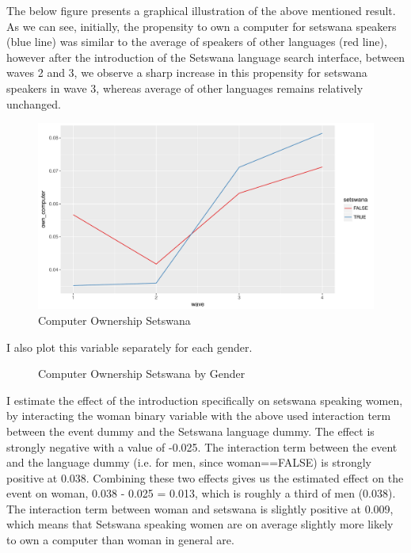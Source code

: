\documentclass[a4paper,british]{article}\usepackage[]{graphicx}\usepackage[]{color}
\makeatletter
\def\maxwidth{ %
  \ifdim\Gin@nat@width>\linewidth
    \linewidth
  \else
    \Gin@nat@width
  \fi
}
\newenvironment{kframe}{%
 \def\at@end@of@kframe{}%
 \ifinner\ifhmode%
  \def\at@end@of@kframe{\end{minipage}}%
  \begin{minipage}{\columnwidth}%
 \fi\fi%
 \def\FrameCommand##1{\hskip\@totalleftmargin \hskip-\fboxsep
 \colorbox{shadecolor}{##1}\hskip-\fboxsep
     \hskip-\linewidth \hskip-\@totalleftmargin \hskip\columnwidth}%
 \MakeFramed {\advance\hsize-\width
   \@totalleftmargin\z@ \linewidth\hsize
   \@setminipage}}%
 {\par\unskip\endMakeFramed%
 \at@end@of@kframe}
\newenvironment{knitrout}{}{} %
\makeatother
\begin{document}
The below figure presents a graphical illustration of the above mentioned
result. As we can see, initially, the propensity to own a computer
for setswana speakers (blue line) was similar to the average of speakers
of other languages (red line), however after the introduction of the
Setswana language search interface, between waves 2 and 3, we observe
a sharp increase in this propensity for setswana speakers in wave
3, whereas average of other languages remains relatively unchanged.

\begin{figure}[H]
\caption{Computer Ownership Setswana}

\begin{knitrout}
\color{fgcolor}
\includegraphics[width=\maxwidth]{../misc/latex-gg2_5-1} 

\end{knitrout}
\end{figure}

I also plot this variable separately for each gender.

\begin{figure}[H]
\caption{Computer Ownership Setswana by Gender}

\begin{knitrout}
\color{fgcolor}\begin{kframe}


{\ttfamily\noindent\bfseries\color{errorcolor}{\#\# Error in grouped\_df\_impl(data, unname(vars), drop): Column `woman` is unknown}}\end{kframe}
\end{knitrout}
\end{figure}

I estimate the effect of the introduction specifically on setswana
speaking women, by interacting the woman binary variable with the
above used interaction term between the event dummy and the Setswana
language dummy. The effect is strongly negative with a value of -0.025.
The interaction term between the event and the language dummy (i.e.
for men, since woman==FALSE) is strongly positive at 0.038. Combining
these two effects gives us the estimated effect on the event on woman,
0.038 - 0.025 = 0.013, which is roughly a third of men (0.038). The
interaction term between woman and setswana is slightly positive at
0.009, which means that Setswana speaking women are on average slightly
more likely to own a computer than woman in general are.
\end{document}
